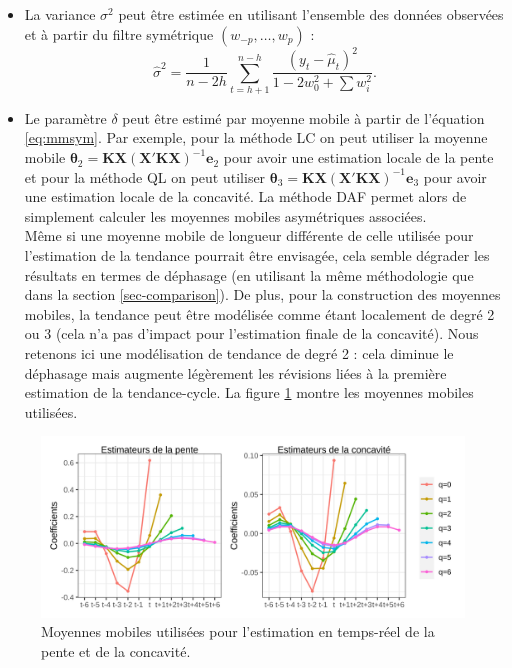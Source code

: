 \documentclass[
  12pt,
  a4paper,french]{article}
\providecommand{\tightlist}{%
  \setlength{\itemsep}{0pt}\setlength{\parskip}{0pt}}
\newcommand\1{\mathds{1}}
\begin{document}
\begin{itemize}
\tightlist
\item
  La variance \(\sigma^2\) peut être estimée en utilisant l'ensemble des données observées et à partir du filtre symétrique \((w_{-p},\dots,w_p)\) :
  \[
  \hat\sigma^2=\frac{1}{n-2h}\sum_{t=h+1}^{n-h}\frac{(y_t-\hat \mu_t)^2}{1-2w_0^2+\sum w_i^2}.
  \]
\item
  Le paramètre \(\delta\) peut être estimé par moyenne mobile à partir de l'équation \eqref{eq:mmsym}.
  Par exemple, pour la méthode LC on peut utiliser la moyenne mobile \(\boldsymbol \theta_2=\boldsymbol K\boldsymbol X(\boldsymbol X'\boldsymbol K\boldsymbol X)^{-1}\boldsymbol e_{2}\) pour avoir une estimation locale de la pente et pour la méthode QL on peut utiliser \(\boldsymbol \theta_3=\boldsymbol K\boldsymbol X(\boldsymbol X'\boldsymbol K\boldsymbol X)^{-1}\boldsymbol e_{3}\) pour avoir une estimation locale de la concavité.
  La méthode DAF permet alors de simplement calculer les moyennes mobiles asymétriques associées.\\
  Même si une moyenne mobile de longueur différente de celle utilisée pour l'estimation de la tendance pourrait être envisagée, cela semble dégrader les résultats en termes de déphasage (en utilisant la même méthodologie que dans la section \ref{sec-comparison}).
  De plus, pour la construction des moyennes mobiles, la tendance peut être modélisée comme étant localement de degré 2 ou 3 (cela n'a pas d'impact pour l'estimation finale de la concavité).
  Nous retenons ici une modélisation de tendance de degré 2 : cela diminue le déphasage mais augmente légèrement les révisions liées à la première estimation de la tendance-cycle.
  La figure \ref{fig:mmpenteconcac} montre les moyennes mobiles utilisées.
\end{itemize}

\begin{figure}

{\centering \includegraphics[width=0.9\linewidth]{img/filters_used/mm_penteconcavite} 

}

\caption[Moyennes mobiles utilisées pour l'estimation en temps-réel de la pente et de la concavité]{Moyennes mobiles utilisées pour l'estimation en temps-réel de la pente et de la concavité.}\label{fig:mmpenteconcac}

\footnotesize
\normalsize\end{figure}
\end{document}
